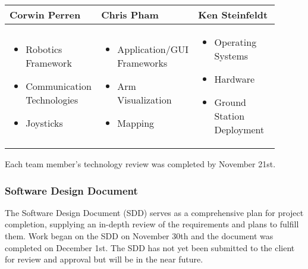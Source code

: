 \vspace{1em}
\begin{tabular}{| p{0.3\linewidth} | p{0.3\linewidth} | p{0.3\linewidth} |}
\hline\bf Corwin Perren & \bf Chris Pham & \bf Ken Steinfeldt \\\hline


\begin{itemize}
\item Robotics Framework
\item Communication Technologie\-s
\item Joysticks
\end{itemize}

&
\begin{itemize}
\item Application/GUI Framewor\-ks
\item Arm Visualization
\item Mapping
\end{itemize}

&
\begin{itemize}
\item Operating Systems
\item Hardware
\item Ground Station Deployment
\end{itemize}\\\hline
\end{tabular}
\vspace{1em}

Each team member's technology review was completed by November 21st.

\subsubsection{Software Design Document}
The Software Design Document (SDD) serves as a comprehensive plan for project completion, supplying an in-depth review of the requirements and plans to fulfill them.
Work began on the SDD on November 30th and the document was completed on December 1st. 
The SDD has not yet been submitted to the client for review and approval but will be in the near future.
